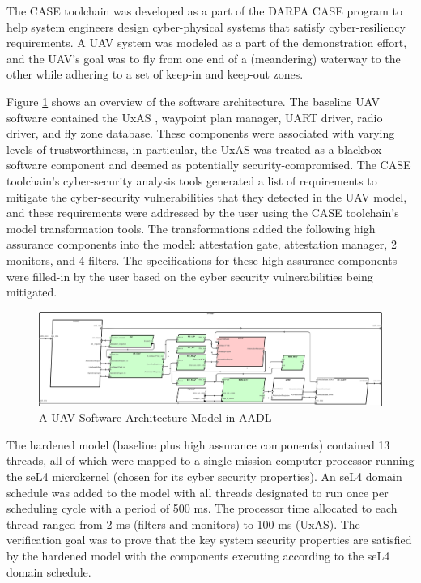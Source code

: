 

 
The CASE toolchain was developed as a part of the DARPA CASE program to help system engineers design cyber-physical systems that satisfy cyber-resiliency requirements.
A UAV system was modeled as a part of the demonstration effort,
and the UAV's goal was to fly from one end of a (meandering) waterway to the other while adhering to a set of keep-in and keep-out zones.

Figure \ref{SW} shows an overview of the software architecture.
The baseline UAV software contained the UxAS \cite{uxas}, waypoint plan manager, UART driver, radio driver, and fly zone database.
These components were associated with varying levels of trustworthiness,
in particular, the UxAS was treated as a blackbox software component and deemed as potentially security-compromised.
The CASE toolchain's cyber-security analysis tools generated a list of requirements to mitigate the cyber-security vulnerabilities that they detected in the UAV model,
and these requirements were addressed by the user using the CASE toolchain's model transformation tools.
The transformations added the following high assurance components into the model:
attestation gate, attestation manager, 2 monitors, and 4 filters.
The specifications for these high assurance components were filled-in by the user based on the cyber security vulnerabilities being mitigated.

\begin{figure}[ht!]
\centering
\includegraphics[width=120mm]{sw3.png}
\caption{A UAV Software Architecture Model in AADL \label{SW}}
\end{figure}

The hardened model (baseline plus high assurance components) contained 13 threads,
all of which were mapped to a single mission computer processor running the seL4 microkernel (chosen for its cyber security properties).
An seL4 domain schedule was added to the model with all threads designated to run once per scheduling cycle with a period of 500 ms.
The processor time allocated to each thread ranged from 2 ms (filters and monitors) to 100 ms (UxAS).
The verification goal was to prove that the key system security properties are satisfied by the hardened model with the components executing according to the seL4 domain schedule.

